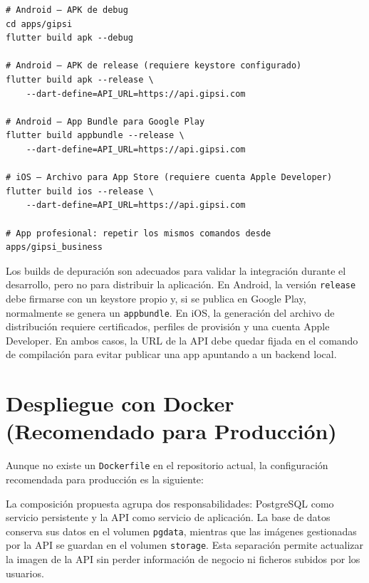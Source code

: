 \documentclass[12pt,a4paper,twoside]{report}
\begin{document}
\begin{lstlisting}[style=yamlStyle, caption={Compilación para Android e iOS}, label={lst:build}]
# Android — APK de debug
cd apps/gipsi
flutter build apk --debug

# Android — APK de release (requiere keystore configurado)
flutter build apk --release \
    --dart-define=API_URL=https://api.gipsi.com

# Android — App Bundle para Google Play
flutter build appbundle --release \
    --dart-define=API_URL=https://api.gipsi.com

# iOS — Archivo para App Store (requiere cuenta Apple Developer)
flutter build ios --release \
    --dart-define=API_URL=https://api.gipsi.com

# App profesional: repetir los mismos comandos desde apps/gipsi_business
\end{lstlisting}

Los builds de depuración son adecuados para validar la integración durante el
desarrollo, pero no para distribuir la aplicación. En Android, la versión
\texttt{release} debe firmarse con un keystore propio y, si se publica en
Google Play, normalmente se genera un \texttt{appbundle}. En iOS, la generación
del archivo de distribución requiere certificados, perfiles de provisión y una
cuenta Apple Developer. En ambos casos, la URL de la API debe quedar fijada en
el comando de compilación para evitar publicar una app apuntando a un backend
local.

\section{Despliegue con Docker (Recomendado para Producción)}

Aunque no existe un \texttt{Dockerfile} en el repositorio actual, la configuración recomendada para producción es la siguiente:

La composición propuesta agrupa dos responsabilidades: PostgreSQL como servicio
persistente y la API como servicio de aplicación. La base de datos conserva sus
datos en el volumen \texttt{pgdata}, mientras que las imágenes gestionadas por
la API se guardan en el volumen \texttt{storage}. Esta separación permite
actualizar la imagen de la API sin perder información de negocio ni ficheros
subidos por los usuarios.
\end{document}
